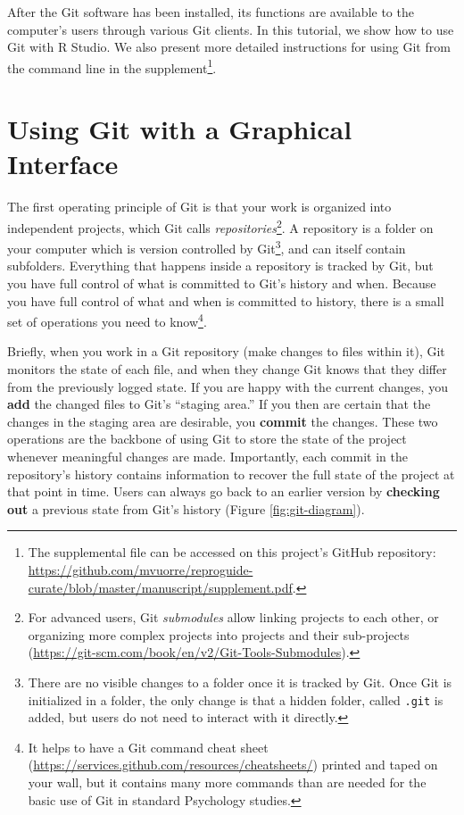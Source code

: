 \documentclass[
  american,
  ,doc,floatsintext]{apa6}
\begin{document}
After the Git software has been installed, its functions are available to the computer's users through various Git clients. In this tutorial, we show how to use Git with R Studio. We also present more detailed instructions for using Git from the command line in the supplement\footnote{The supplemental file can be accessed on this project's GitHub repository: \url{https://github.com/mvuorre/reproguide-curate/blob/master/manuscript/supplement.pdf}.}.

\hypertarget{using-git-with-a-graphical-interface}{%
\section{Using Git with a Graphical Interface}\label{using-git-with-a-graphical-interface}}

The first operating principle of Git is that your work is organized into independent projects, which Git calls \emph{repositories}\footnote{For advanced users, Git \emph{submodules} allow linking projects to each other, or organizing more complex projects into projects and their sub-projects (\url{https://git-scm.com/book/en/v2/Git-Tools-Submodules}).}. A repository is a folder on your computer which is version controlled by Git\footnote{There are no visible changes to a folder once it is tracked by Git. Once Git is initialized in a folder, the only change is that a hidden folder, called \texttt{.git} is added, but users do not need to interact with it directly.}, and can itself contain subfolders. Everything that happens inside a repository is tracked by Git, but you have full control of what is committed to Git's history and when. Because you have full control of what and when is committed to history, there is a small set of operations you need to know\footnote{It helps to have a Git command cheat sheet (\url{https://services.github.com/resources/cheatsheets/}) printed and taped on your wall, but it contains many more commands than are needed for the basic use of Git in standard Psychology studies.}.

Briefly, when you work in a Git repository (make changes to files within it), Git monitors the state of each file, and when they change Git knows that they differ from the previously logged state. If you are happy with the current changes, you \textbf{add} the changed files to Git's ``staging area.'' If you then are certain that the changes in the staging area are desirable, you \textbf{commit} the changes. These two operations are the backbone of using Git to store the state of the project whenever meaningful changes are made. Importantly, each commit in the repository's history contains information to recover the full state of the project at that point in time. Users can always go back to an earlier version by \textbf{checking out} a previous state from Git's history (Figure \ref{fig:git-diagram}).
\end{document}
